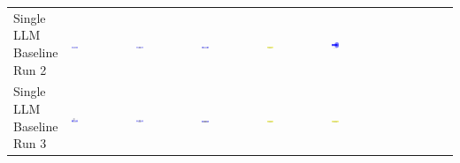 \begin{table}
\begin{tabular}{@{}mmmmmm@{}}
    \makecell{Single LLM \\ Baseline \\ Run 2} & \includegraphics[width=0.13\textwidth]{./run_2/png/gpt-4o_results/DLDChip.png} & \includegraphics[width=0.13\textwidth]{./run_2/png/o1-preview_results/DLDChip.png} & \includegraphics[width=0.13\textwidth]{./run_2/png/claude-3-5-sonnet-20240620_results/DLDChip.png} & \includegraphics[width=0.13\textwidth]{./run_2/png/watsonx_meta-llama_llama-3-1-70b-instruct_results/DLDChip.png} & \includegraphics[width=0.13\textwidth]{./run_2/png/watsonx_meta-llama_llama-3-405b-instruct_results/DLDChip.png} \\
    \makecell{Single LLM \\ Baseline \\ Run 3} & \includegraphics[width=0.13\textwidth]{./run_3/png/gpt-4o_results/DLDChip.png} & \includegraphics[width=0.13\textwidth]{./run_3/png/o1-preview_results/DLDChip.png} & \includegraphics[width=0.13\textwidth]{./run_3/png/claude-3-5-sonnet-20240620_results/DLDChip.png} & \includegraphics[width=0.13\textwidth]{./run_3/png/watsonx_meta-llama_llama-3-1-70b-instruct_results/DLDChip.png} & \includegraphics[width=0.13\textwidth]{./run_3/png/watsonx_meta-llama_llama-3-405b-instruct_results/DLDChip.png} \\

\end{tabular}
\end{table}
